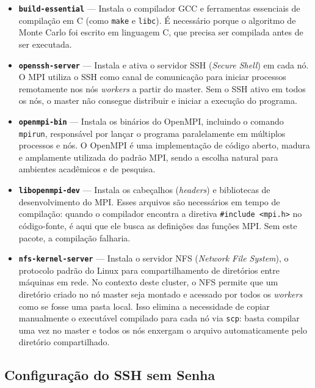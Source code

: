 \documentclass[
	12pt,
	oneside,
	a4paper,
	chapter=TITLE,
	section=TITLE,
	english,
	brazil,
	sumario=tradicional
]{abntex2}
\begin{document}
\begin{itemize}
 
  \item \textbf{\texttt{build-essential}} — Instala o compilador GCC
  e ferramentas essenciais de compilação em C (como \texttt{make} e
  \texttt{libc}). É necessário porque o algoritmo de Monte Carlo foi
  escrito em linguagem C, que precisa ser compilada antes de ser
  executada.
 
  \item \textbf{\texttt{openssh-server}} — Instala e ativa o servidor
  SSH (\textit{Secure Shell}) em cada nó. O MPI utiliza o SSH como
  canal de comunicação para iniciar processos remotamente nos nós
  \textit{workers} a partir do master. Sem o SSH ativo em todos os
  nós, o master não consegue distribuir e iniciar a execução do
  programa.
 
  \item \textbf{\texttt{openmpi-bin}} — Instala os binários do
  OpenMPI, incluindo o comando \texttt{mpirun}, responsável por
  lançar o programa paralelamente em múltiplos processos e nós.
  O OpenMPI é uma implementação de código aberto, madura
  e amplamente utilizada do padrão MPI, sendo a escolha natural
  para ambientes acadêmicos e de pesquisa.
 
  \item \textbf{\texttt{libopenmpi-dev}} — Instala os cabeçalhos
  (\textit{headers}) e bibliotecas de desenvolvimento do MPI. Esses
  arquivos são necessários em tempo de compilação: quando o compilador
  encontra a diretiva \texttt{\#include <mpi.h>} no código-fonte,
  é aqui que ele busca as definições das funções MPI. Sem este
  pacote, a compilação falharia.

  \item \textbf{\texttt{nfs-kernel-server}} — Instala o servidor NFS
  (\textit{Network File System}), o protocolo padrão do Linux para
  compartilhamento de diretórios entre máquinas em rede. No contexto
  deste cluster, o NFS permite que um diretório criado no nó master
  seja montado e acessado por todos os \textit{workers} como se fosse
  uma pasta local. Isso elimina a necessidade de copiar manualmente o
  executável compilado para cada nó via \texttt{scp}: basta compilar
  uma vez no master e todos os nós enxergam o arquivo automaticamente
  pelo diretório compartilhado.
 
\end{itemize}

\subsection{Configuração do SSH sem Senha}
\end{document}
